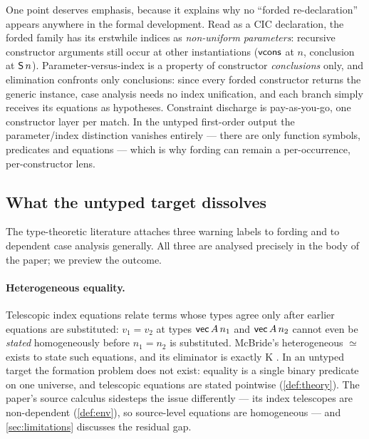 One point deserves emphasis, because it explains why no
``forded re-declaration'' appears anywhere in the formal development.
Read as a CIC declaration, the forded family has its erstwhile indices as
\emph{non-uniform parameters}: recursive constructor arguments still
occur at other instantiations ($\mathsf{vcons}$ at $n$, conclusion at
$\mathsf{S}\,n$).  Parameter-versus-index is a property of constructor
\emph{conclusions} only, and elimination confronts only conclusions:
since every forded constructor returns the generic instance, case
analysis needs no index unification, and each branch simply receives its
equations as hypotheses.  Constraint discharge is pay-as-you-go, one
constructor layer per match.  In the untyped first-order output the
parameter/index distinction vanishes entirely --- there are only function
symbols, predicates and equations --- which is why fording can remain a
per-occurrence, per-constructor lens.

\subsection{What the untyped target dissolves}
\label{sec:fording-dissolves}

The type-theoretic literature attaches three warning labels to fording
and to dependent case analysis generally.  All three are analysed
precisely in the body of the paper; we preview the outcome.

\paragraph{Heterogeneous equality.}  Telescopic index equations relate
terms whose types agree only after earlier equations are substituted:
$v_1 = v_2$ at types $\mathsf{vec}\,A\,n_1$ and $\mathsf{vec}\,A\,n_2$ cannot even be
\emph{stated} homogeneously before $n_1 = n_2$ is substituted.  McBride's
heterogeneous $\simeq$ exists to state such equations, and its eliminator
is exactly K \cite{McBride1999,CockxEtAl2014}.  In an untyped target the
formation problem does not exist: equality is a single binary predicate
on one universe, and telescopic equations are stated pointwise
(\cref{def:theory}).  The paper's source calculus sidesteps the issue
differently --- its index telescopes are non-dependent
(\cref{def:env}), so source-level equations are homogeneous --- and
\cref{sec:limitations} discusses the residual gap.

